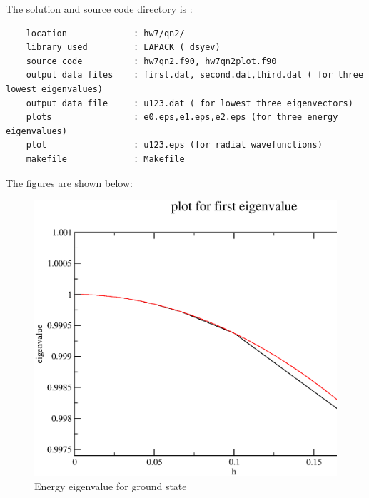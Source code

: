 \documentclass[11pt,a4paper,english]{article}
\begin{document}
    The solution and source code directory is :\\
    \begin{verbatim}
	location             : hw7/qn2/
	library used         : LAPACK ( dsyev)
	source code          : hw7qn2.f90, hw7qn2plot.f90
	output data files    : first.dat, second.dat,third.dat ( for three lowest eigenvalues)
	output data file     : u123.dat ( for lowest three eigenvectors)
	plots                : e0.eps,e1.eps,e2.eps (for three energy eigenvalues)
	plot                 : u123.eps (for radial wavefunctions)
	makefile             : Makefile
	\end{verbatim}
    
    The figures are shown below:\\
	\begin{figure}[h!]
	\centering
	\includegraphics [scale=0.6]{e0.eps}
	\caption{Energy eigenvalue for ground state }
	\end{figure}
	\clearpage
	
\end{document}
